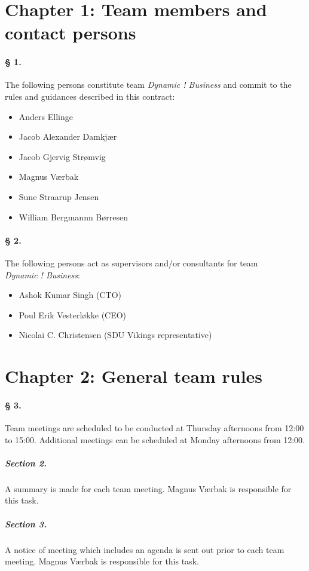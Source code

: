 \section*{Chapter 1: Team members and contact persons}
\paragraph{§ 1.}
The following persons constitute team \emph{Dynamic ! Business} and commit to the rules and guidances described in this contract:
\begin{itemize}
\item Anders Ellinge
\item Jacob Alexander Damkjær
\item Jacob Gjervig Strømvig
\item Magnus Værbak
\item Sune Straarup Jensen
\item William Bergmannn Børresen
\end{itemize}

\paragraph{§ 2.}
The following persons act as supervisors and/or consultants for team \\ \emph{Dynamic ! Business}:
\begin{itemize}
\item Ashok Kumar Singh (CTO)
\item Poul Erik Vesterløkke (CEO)
\item Nicolai C. Christensen (SDU Vikings representative)
\end{itemize}

\section*{Chapter 2: General team rules}
\paragraph{§ 3.}
Team meetings are scheduled to be conducted at Thursday afternoons from 12:00 to 15:00. Additional meetings can be scheduled at Monday afternoons from 12:00.
\subparagraph{Section 2.} 
A summary is made for each team meeting. Magnus Værbak is responsible for this task.
\subparagraph{Section 3.}
A notice of meeting which includes an agenda is sent out prior to each team meeting. Magnus Værbak is responsible for this task. 

